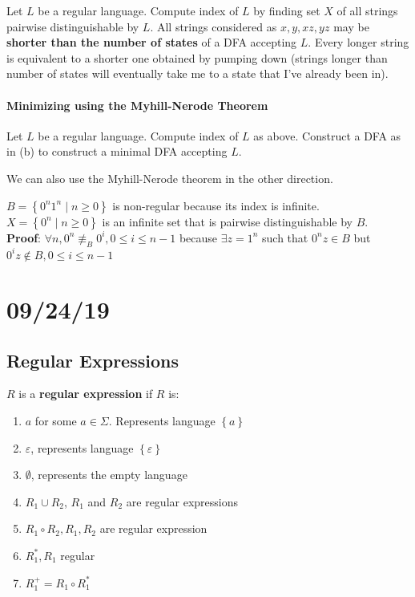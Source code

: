 \documentclass[12 pt]{article}
\begin{document}
Let $L$ be a regular language. Compute index of $L$ by finding set $X$
of all strings pairwise distinguishable by $L$. All strings considered
as $x, y, xz, yz$ may be \textbf{shorter than the number of states}
of a DFA accepting $L$. Every longer string is equivalent to a shorter
one obtained by pumping down (strings longer than number of states
will eventually take me to a state that I've already been in).

\paragraph{Minimizing using the Myhill-Nerode Theorem}
Let $L$ be a regular language. Compute index of $L$ as
above. Construct a DFA as in (b) to construct a minimal DFA accepting $L$.

We can also use the Myhill-Nerode theorem in the other direction.

$B = \left\{0^n1^n \mid n \geq 0 \right\}$ is non-regular because its
index is infinite. $X = \left\{0^n \mid n \geq 0\right\}$ is an
infinite set that is pairwise distinguishable by $B$.
\\ \textbf{Proof}: $\forall n, 0^n \not \equiv_B 0^i, 0 \leq i \leq
n-1$ because $\exists z =1^n$ such that $0^nz \in B$ but $0^iz \notin
B, 0 \leq i \leq n-1$
\section{09/24/19}
\subsection{Regular Expressions}
$R$ is a \textbf{regular expression} if $R$ is:
\begin{enumerate}
\item $a$ for some $a \in \Sigma$. Represents language $\left\{a\right\}$
\item $\varepsilon$, represents language $\left\{\varepsilon\right\}$
\item $\emptyset$, represents the empty language
\item $R_1 \cup R_2$, $R_1$ and $R_2$ are regular expressions
\item $R_1 \circ R_2, R_1, R_2$ are regular expression
\item $R_1^*, R_1$ regular
\item $R_1^+ = R_1 \circ R_1^*$
\end{enumerate}
\end{document}
